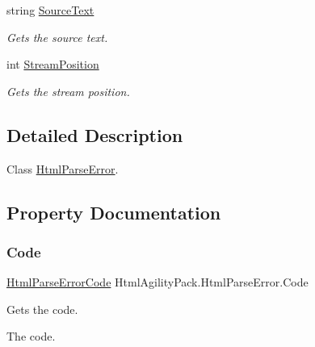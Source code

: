 \begin{DoxyCompactItemize}
string \hyperlink{class_html_agility_pack_1_1_html_parse_error_acde8492c1173bb945b58b2978fe79b23}{Source\+Text}
\begin{DoxyCompactList}\small\item\em Gets the source text. \end{DoxyCompactList}\item 
int \hyperlink{class_html_agility_pack_1_1_html_parse_error_ad225cae4703ea017eb132a0d2c7061e8}{Stream\+Position}
\begin{DoxyCompactList}\small\item\em Gets the stream position. \end{DoxyCompactList}\end{DoxyCompactItemize}


\subsection{Detailed Description}
Class \hyperlink{class_html_agility_pack_1_1_html_parse_error}{Html\+Parse\+Error}. 



\subsection{Property Documentation}
\mbox{\label{class_html_agility_pack_1_1_html_parse_error_a68b06ae2e975f930dc9b512411b8535b}} 
\subsubsection{\texorpdfstring{Code}{Code}}
{\footnotesize\ttfamily \hyperlink{namespace_html_agility_pack_a73f43e39297685e4ddb8101f07585e45}{Html\+Parse\+Error\+Code} Html\+Agility\+Pack.\+Html\+Parse\+Error.\+Code\hspace{0.3cm}{\ttfamily [get]}}



Gets the code. 

The code.\mbox{\label{class_html_agility_pack_1_1_html_parse_error_a4868d0c19c5d2b1494705c520b7b93f8}} 
